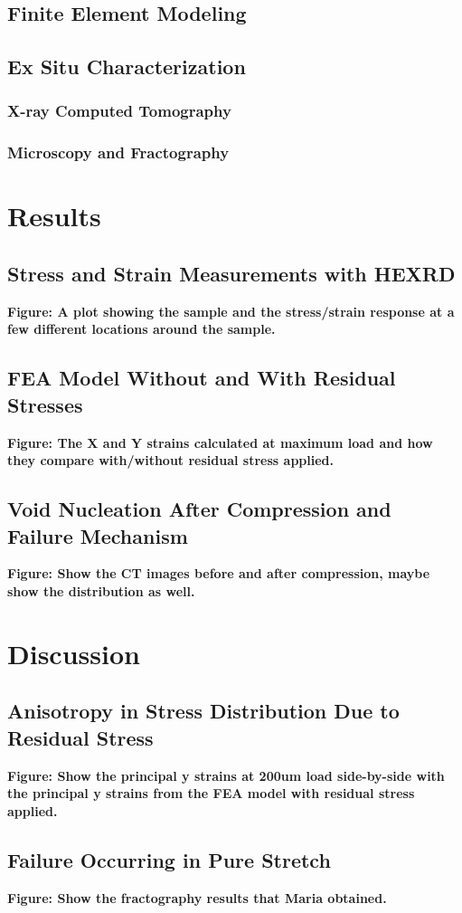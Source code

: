 \documentclass[twocolumn,nofootinbib]{revtex4-1}
\begin{document}
\subsection{Finite Element Modeling}
\subsection{Ex Situ Characterization}
\subsubsection{X-ray Computed Tomography}
\subsubsection{Microscopy and Fractography}

\section{Results}
\subsection{Stress and Strain Measurements with HEXRD}
\textbf{Figure: A plot showing the sample and the stress/strain response at a few different locations around the sample.}
\subsection{FEA Model Without and With Residual Stresses}
\textbf{Figure: The X and Y strains calculated at maximum load  and how they compare with/without residual stress applied.}
\subsection{Void Nucleation After Compression and Failure Mechanism}
\textbf{Figure: Show the CT images before and after compression, maybe show the distribution as well.}

\section{Discussion}
\subsection{Anisotropy in Stress Distribution Due to Residual Stress}
\textbf{Figure: Show the principal y strains at 200um load side-by-side with the principal y strains from the FEA model with residual stress applied.}
\subsection{Failure Occurring in Pure Stretch}
\textbf{Figure: Show the fractography results that Maria obtained.}


\end{document}
